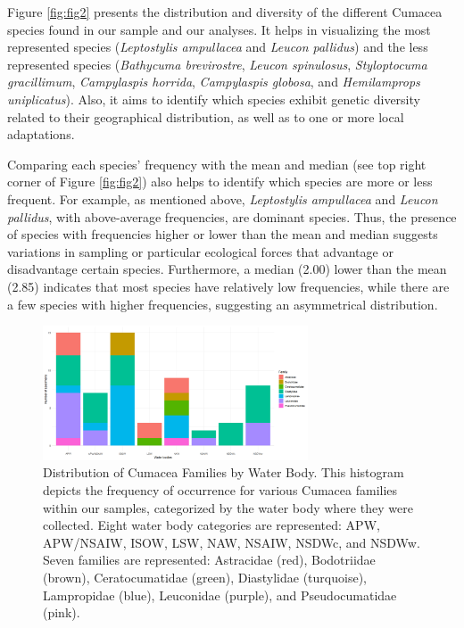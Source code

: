 Figure \ref{fig:fig2} presents the distribution and diversity of the different Cumacea species found in our sample and our analyses. It helps in visualizing the most represented species (\emph{Leptostylis ampullacea} and \emph{Leucon pallidus}) and the less represented species (\emph{Bathycuma brevirostre}, \emph{Leucon spinulosus}, \emph{Styloptocuma gracillimum}, \emph{Campylaspis horrida}, \emph{Campylaspis globosa}, and \emph{Hemilamprops uniplicatus}). Also, it aims to identify which species exhibit genetic diversity related to their geographical distribution, as well as to one or more local adaptations.

Comparing each species' frequency with the mean and median (see top right corner of Figure \ref{fig:fig2}) also helps to identify which species are more or less frequent. For example, as mentioned above, \emph{Leptostylis ampullacea} and \emph{Leucon pallidus}, with above-average frequencies, are dominant species. Thus, the presence of species with frequencies higher or lower than the mean and median suggests variations in sampling or particular ecological forces that advantage or disadvantage certain species. Furthermore, a median (2.00) lower than the mean (2.85) indicates that most species have relatively low frequencies, while there are a few species with higher frequencies, suggesting an asymmetrical distribution. 

\begin{figure}[htbp]
    \centering
    \includegraphics[width=0.7\textwidth]{figure3.png}
    \caption{Distribution of Cumacea Families by Water Body. This histogram depicts the frequency of occurrence for various Cumacea families within our samples, categorized by the water body where they were collected. Eight water body categories are represented: APW, APW/NSAIW, ISOW, LSW, NAW, NSAIW, NSDWc, and NSDWw. Seven families are represented: Astracidae (red), Bodotriidae (brown), Ceratocumatidae (green), Diastylidae (turquoise), Lampropidae (blue), Leuconidae (purple), and Pseudocumatidae (pink). \label{fig:fig3}}
\end{figure}

